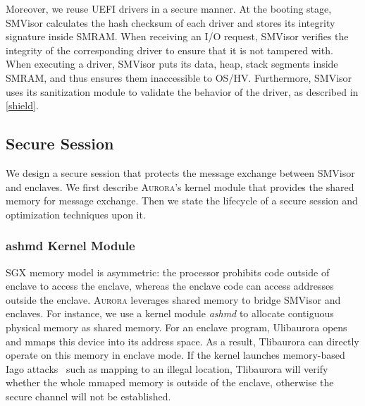Moreover, we reuse UEFI drivers in a secure manner. At the booting stage, SMVisor calculates the hash checksum of each driver and stores its integrity signature inside SMRAM. When receiving an I/O request, SMVisor verifies the integrity of the corresponding driver to ensure that it is not tampered with. %
When executing a driver, SMVisor puts its data, heap, stack segments  inside SMRAM, and thus ensures them inaccessible to OS/HV. Furthermore, SMVisor uses its sanitization module to validate the behavior of the driver, as described in \autoref{shield}.


\subsection{Secure Session}\label{secure_session}

We design a secure session that protects the message exchange between SMVisor and enclaves. We first describe \textsc{Aurora}'s kernel module that provides the shared memory for message exchange. Then we state the lifecycle of a secure session and optimization techniques upon it.

\subsubsection{ashmd Kernel Module}
SGX memory model is asymmetric: the processor prohibits code outside of enclave to access the enclave, whereas the enclave code can access addresses outside the enclave. \textsc{Aurora} leverages shared memory to bridge SMVisor and enclaves. For instance, we use a kernel module \emph{ashmd} to allocate contiguous physical memory as shared memory. For an enclave program, Ulibaurora opens and mmaps this device into its  address space. As a result, Tlibaurora can directly operate on this memory in enclave mode. If the kernel launches memory-based Iago attacks~\cite{DBLP:conf/asplos/CheckowayS13} such as mapping to an illegal location, Tlibaurora will verify whether the whole mmaped memory is outside of the enclave, otherwise the secure channel will not be established. 

